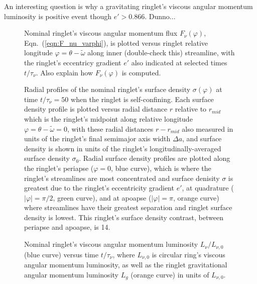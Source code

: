 \documentclass[preprint]{aastex62}
\begin{document}
An interesting question is why a gravitating ringlet's viscous angular momentum luminosity is
positive event though $e'>0.866$. Dunno...

\begin{figure}
    \caption{
        \label{fig:F_nu_nominal}
        Nominal ringlet's viscous angular momentum flux $F_{\nu}(\varphi)$,
        Eqn.\ (\ref{eqn:F_nu_varphi}),  is plotted versus ringlet
        relative longitude $\varphi=\theta-\tilde{\omega}$ along inner (double-check this)
        streamline, with the ringlet's eccentricy gradient $e'$ also indicated
        at selected times $t/\tau_\nu$. Also explain how $F_{\nu}(\varphi)$ is computed.
    }
\end{figure}

\begin{figure}
    \caption{
        \label{fig:radial_sigma_nominal}
        Radial profiles of the nominal ringlet's surface density $\sigma(\varphi)$ at time $t/\tau_\nu=50$
        when the ringlet is self-confining. Each surface density profile is plotted versus radial distance $r$ 
        relative to $r_{mid}$ which is the ringlet's midpoint along relative longitude $\varphi = \theta-\tilde{\omega}=0$,
        with these radial distances $r - r_{mid}$ also measured in units of the ringlet's final semimajor axis width $\Delta a$,
        and surface density is shown in units of the ringlet's longitudinally-averaged surface density $\sigma_0$.
        Radial surface density profiles are plotted along the ringlet's periapse ($\varphi=0$, blue curve), which is 
        where the ringlet's streamlines are most concentrated and surface denisity $\sigma$ is
        greatest due to the ringlet's eccentricity gradient $e'$, at quadrature ($|\varphi|=\pi/2$, green curve),
        and at apoapse ($|\varphi|=\pi$, orange curve) where streamlines have their greatest separation
        and ringlet surface density is lowest. This ringlet's surface density contrast, between periapse and
        apoapse, is 14.
    }
\end{figure}

\begin{figure}
    \caption{
        \label{fig:angular_momentum_luminosity_nominal}
        Nominal ringlet's viscous angular momentum luminosity $L_\nu/L_{\nu,0}$ (blue curve) versus time $t/\tau_\nu$,
        where $L_{\nu,0}$ is circular ring's viscous angular momentum luminosity, 
        as well as the ringlet gravitational angular momentum luminosity $L_g$ (orange curve) in units of $L_{\nu,0}$.
    }
\end{figure}
\end{document}
